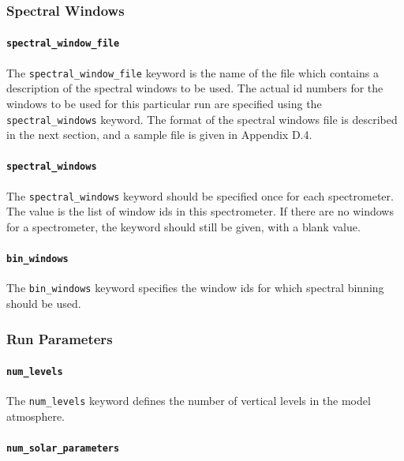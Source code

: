 \documentclass{article}
\begin{document}
\subsubsection{Spectral Windows}

\paragraph{\texttt{spectral\_window\_file}}

The \texttt{spectral\_window\_file} keyword is the name of the file
which contains a description of the spectral windows to be used.  The
actual id numbers for the windows to be used for this particular run
are specified using the \texttt{spectral\_windows} keyword.  The
format of the spectral windows file is described in the next section,
and a sample file is given in Appendix D.4.

\paragraph{\texttt{spectral\_windows}}

The \texttt{spectral\_windows} keyword should be specified once for
each spectrometer.  The value is the list of window ids in this
spectrometer.  If there are no windows for a spectrometer, the keyword
should still be given, with a blank value.

\paragraph{\texttt{bin\_windows}}

The \texttt{bin\_windows} keyword specifies the window ids for which
spectral binning should be used.

\subsubsection{Run Parameters}

\paragraph{\texttt{num\_levels}}

The \texttt{num\_levels} keyword defines the number of vertical levels
in the model atmosphere.  

\paragraph{\texttt{num\_solar\_parameters}}
\end{document}
